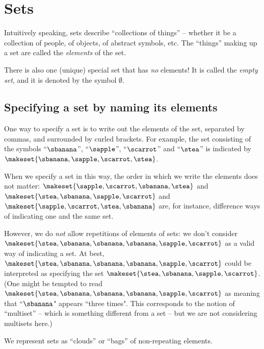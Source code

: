 
\section{Sets}

Intuitively speaking, sets describe ``collections of things'' -- whether it be a collection of people, of objects, of abstract symbols, etc.
The ``things'' making up a set are called the \emph{elements} of the set.

There is also one (unique) special set that has \emph{no} elements!
It is called the \emph{empty set}, and it is denoted by the symbol $\emptyset$.

\subsection{Specifying a set by naming its elements}

One way to specify a set is to write out the elements of the set, separated by commas, and surrounded by curled brackets.
For example, the set consisting of the symbols ``$\sbanana$'', ``$\sapple$'', ``$\scarrot$'' and ``$\stea$'' is indicated by $\makeset{ \sbanana, \sapple, \scarrot, \stea}$.

When we specify a set in this way, the order in which we write the elements does not matter:
$\makeset{ \sapple, \scarrot, \sbanana, \stea}$ and~$\makeset{ \stea, \sbanana, \sapple, \scarrot}$ and~$\makeset{ \sapple, \scarrot, \stea, \sbanana}$ are, for instance, difference ways of indicating one and the same set.

However, we do \emph{not} allow repetitions of elements of sets: we don't consider
$\makeset{ \stea, \sbanana, \sbanana, \sbanana, \sapple, \scarrot }$ as a valid way of indicating a set.
At best, $\makeset{ \stea, \sbanana, \sbanana, \sbanana, \sapple, \scarrot }$ could be interpreted as specifying the set $\makeset{ \stea, \sbanana, \sapple, \scarrot }$.
(One might be tempted to read $\makeset{ \stea, \sbanana, \sbanana, \sbanana, \sapple, \scarrot }$ as meaning that ``$\sbanana$" appears ``three times".
This corresponds to the notion of ``multiset'' -- which is something different from a set -- but we are not considering multisets here.)

\begin{marginfigure}
    \centering
    \caption{We represent sets as ``clouds'' or ``bags'' of non-repeating elements.}
    \label{fig:set_as_clouds}
\end{marginfigure}

